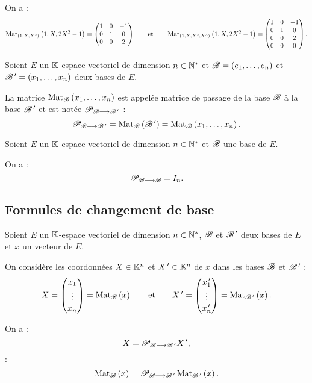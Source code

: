 \begin{corr}
On a : \[\Mat[\paren{1,X,X^2}]{1,X,2X^2-1}=\begin{pmatrix}
1 & 0 & -1 \\
0 & 1 & 0 \\
0 & 0 & 2
\end{pmatrix}\qquad\text{et}\qquad\Mat[\paren{1,X,X^2,X^3}]{1,X,2X^2-1}=\begin{pmatrix}
1 & 0 & -1 \\
0 & 1 & 0 \\
0 & 0 & 2 \\
0 & 0 & 0
\end{pmatrix}.\]
\end{corr}

\begin{defi}
Soient \(E\) un \(\mathbb{K}\)-espace vectoriel de dimension \(n\in\mathbb{N}^*\) et \(\mathscr{B}=\left(e_1,\dots,e_n\right)\) et \(\mathscr{B}^{\,\prime}=\left(x_1,\dots,x_n\right)\) deux bases de \(E\).

La matrice \(\Mat{x_1,\dots,x_n}\) est appelée matrice de passage de la base \(\mathscr{B}\) à la base \(\mathscr{B}^{\,\prime}\) et est notée \(\mathscr{P}_{\mathscr{B}\longrightarrow\mathscr{B}^{\,\prime}}\) : \[\pass{\fami{B}}{\fami{B}\prim}=\Mat{\fami{B}\prim}=\Mat{x_1,\dots,x_n}.\]
\end{defi}

\begin{rem}
Soient \(E\) un \(\mathbb{K}\)-espace vectoriel de dimension \(n\in\mathbb{N}^*\) et \(\mathscr{B}\) une base de \(E\).

On a : \[\mathscr{P}_{\mathscr{B}\longrightarrow\mathscr{B}}=I_n.\]
\end{rem}

\subsection{Formules de changement de base}

\begin{prop}
Soient \(E\) un \(\mathbb{K}\)-espace vectoriel de dimension \(n\in\mathbb{N}^*\), \(\mathscr{B}\) et \(\mathscr{B}^{\,\prime}\) deux bases de \(E\) et \(x\) un vecteur de \(E\).

On considère les coordonnées \(X\in\mathbb{K}^n\) et \(X^{\,\prime}\in\mathbb{K}^n\) de \(x\) dans les bases \(\mathscr{B}\) et \(\mathscr{B}^{\,\prime}\) : \[X=\tcoords{x_1}{\vdots}{x_n}=\Mat{x}\qquad\text{et}\qquad X\prim=\tcoords{x_1\prim}{\vdots}{x_n\prim}=\Mat[\fami{B}\prim]{x}.\]

On a : \[X=\mathscr{P}_{\mathscr{B}\longrightarrow\mathscr{B}^{\,\prime}}X^{\,\prime},\] \cad : \[\Mat{x}=\pass{\fami{B}}{\fami{B}\prim}\Mat[\fami{B}\prim]{x}.\]
\end{prop}

